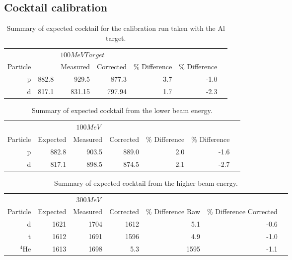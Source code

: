 \subsection{Cocktail calibration}
\label{sec:cocktail}

\begin{table*}\centering
{}
\begin{tabular}{@{}rrrrrrr@{}}\toprule
& \multicolumn{3}{c}{$100 MeV Target$}\\
\cmidrule{2-4}
Particle &\phantom{abc} & Measured & Corrected & \% Difference & \% Difference\\
\midrule
p   & 882.8 & 929.5 & 877.3   &  3.7  & -1.0  \\
d   & 817.1 & 831.15 & 797.94 &  1.7  & -2.3\\
\bottomrule
\end{tabular}
\caption{Summary of expected cocktail for the calibration run taken with the Al target. }
\label{tb:cocktail100tar}
\end{table*}

\begin{table*}\centering
{}
\begin{tabular}{@{}rrrrrrr@{}}\toprule
& \multicolumn{3}{c}{$100 MeV$}\\
\cmidrule{2-4}
Particle & Expected & Measured & Corrected & \% Difference & \% Difference\\
\midrule
p   & 882.8 & 903.5 & 889.0 &  2.0   & -1.6  \\
d   & 817.1 & 898.5 & 874.5 &  2.1   & -2.7\\
\bottomrule
\end{tabular}
\caption{Summary of expected cocktail from the lower beam energy.}
\label{tb:cocktail100}
\end{table*}

\begin{table*}\centering
{}
\begin{tabular}{@{}rrrrrrr@{}}\toprule
& \multicolumn{3}{c}{$300 MeV$}\\
\cmidrule{2-4}
Particle & Expected & Measured & Corrected & \% Difference Raw & \% Difference Corrected\\
\midrule
d   & 1621 & 1704 & 1612   &  5.1 & -0.6  \\
t   & 1612 & 1691 & 1596   &  4.9  & -1.0\\
${}^{4}$He   & 1613 & 1698 &  5.3 & 1595  & -1.1\\

\bottomrule
\end{tabular}
\caption{Summary of expected cocktail from the higher beam energy.}
\label{tb:cocktail300}
\end{table*}

